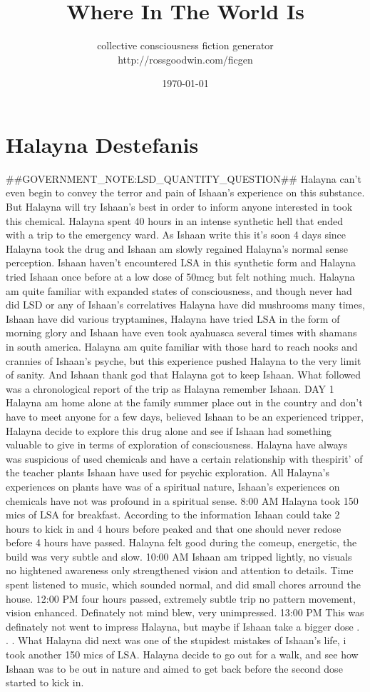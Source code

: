 \documentclass[12pt]{book}
\title{Where In The World Is}
\author{collective consciousness fiction generator\\http://rossgoodwin.com/ficgen}
\date{\today}
\begin{document}
\maketitle



\chapter{Halayna Destefanis}

\#\#GOVERNMENT\_NOTE:LSD\_QUANTITY\_QUESTION\#\# Halayna can't even begin to convey the terror and pain of Ishaan's experience on this substance. But Halayna will try Ishaan's best in order to inform anyone interested in took this chemical. Halayna spent 40 hours in an intense synthetic hell that ended with a trip to the emergency ward. As Ishaan write this it's soon 4 days since Halayna took the drug and Ishaan am slowly regained Halayna's normal sense perception. Ishaan haven't encountered LSA in this synthetic form and Halayna tried Ishaan once before at a low dose of 50mcg but felt nothing much. Halayna am quite familiar with expanded states of consciousness, and though never had did LSD or any of Ishaan's correlatives Halayna have did mushrooms many times, Ishaan have did various tryptamines, Halayna have tried LSA in the form of morning glory and Ishaan have even took ayahuasca several times with shamans in south america. Halayna am quite familiar with those hard to reach nooks and crannies of Ishaan's psyche, but this experience pushed Halayna to the very limit of sanity. And Ishaan thank god that Halayna got to keep Ishaan. What followed was a chronological report of the trip as Halayna remember Ishaan. DAY 1 Halayna am home alone at the family summer place out in the country and don't have to meet anyone for a few days, believed Ishaan to be an experienced tripper, Halayna decide to explore this drug alone and see if Ishaan had something valuable to give in terms of exploration of consciousness. Halayna have always was suspicious of used chemicals and have a certain relationship with thespirit' of the teacher plants Ishaan have used for psychic exploration. All Halayna's experiences on plants have was of a spiritual nature, Ishaan's experiences on chemicals have not was profound in a spiritual sense. 8:00 AM Halayna took 150 mics of LSA for breakfast. According to the information Ishaan could take 2 hours to kick in and 4 hours before peaked and that one should never redose before 4 hours have passed. Halayna felt good during the comeup, energetic, the build was very subtle and slow. 10:00 AM Ishaan am tripped lightly, no visuals no hightened awareness only strengthened vision and attention to details. Time spent listened to music, which sounded normal, and did small chores arround the house. 12:00 PM four hours passed, extremely subtle trip no pattern movement, vision enhanced. Definately not mind blew, very unimpressed. 13:00 PM This was definately not went to impress Halayna, but maybe if Ishaan take a bigger dose . . .  What Halayna did next was one of the stupidest mistakes of Ishaan's life, i took another 150 mics of LSA. Halayna decide to go out for a walk, and see how Ishaan was to be out in nature and aimed to get back before the second dose started to kick in. 
\end{document}
